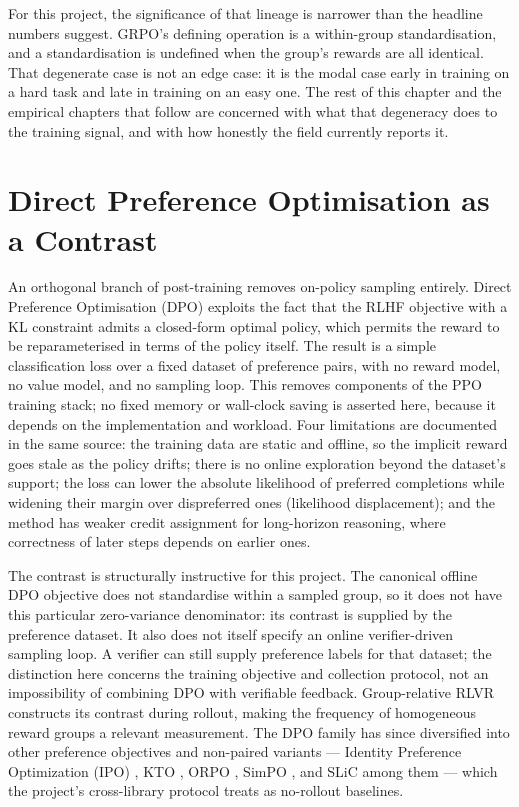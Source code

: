 \documentclass[12pt,a4paper]{report}
\begin{document}
For this project, the significance of that lineage is narrower than the
headline numbers suggest. GRPO's defining operation is a within-group
standardisation, and a standardisation is undefined when the group's
rewards are all identical. That degenerate case is not an edge case: it
is the modal case early in training on a hard task and late in training
on an easy one. The rest of this chapter and the empirical chapters that
follow are concerned with what that degeneracy does to the training
signal, and with how honestly the field currently reports it.

\section{Direct Preference Optimisation as a
Contrast}\label{direct-preference-optimisation-as-a-contrast}

An orthogonal branch of post-training removes on-policy sampling
entirely. Direct Preference Optimisation (DPO) \citep{rafailov2023dpo}
exploits the fact that the RLHF objective with a KL constraint admits a
closed-form optimal policy, which permits the reward to be
reparameterised in terms of the policy itself. The result is a simple
classification loss over a fixed dataset of preference pairs, with no
reward model, no value model, and no sampling loop. This removes
components of the PPO training stack; no fixed memory or wall-clock
saving is asserted here, because it depends on the implementation and
workload. Four limitations are documented in the same source: the
training data are static and offline, so the implicit reward goes stale
as the policy drifts; there is no online exploration beyond the
dataset's support; the loss can lower the absolute likelihood of
preferred completions while widening their margin over dispreferred ones
(likelihood displacement); and the method has weaker credit assignment
for long-horizon reasoning, where correctness of later steps depends on
earlier ones.

The contrast is structurally instructive for this project. The canonical
offline DPO objective does not standardise within a sampled group, so it
does not have this particular zero-variance denominator: its contrast is
supplied by the preference dataset. It also does not itself specify an
online verifier-driven sampling loop. A verifier can still supply
preference labels for that dataset; the distinction here concerns the
training objective and collection protocol, not an impossibility of
combining DPO with verifiable feedback. Group-relative RLVR constructs
its contrast during rollout, making the frequency of homogeneous reward
groups a relevant measurement. The DPO family has since diversified into
other preference objectives and non-paired variants --- Identity
Preference Optimization (IPO) \citep{azar2023ipo}, KTO
\citep{ethayarajh2024kto}, ORPO \citep{hong2024orpo}, SimPO
\citep{meng2024simpo}, and SLiC \citep{zhao2023slichf} among them ---
which the project's cross-library protocol treats as no-rollout
baselines.
\end{document}
